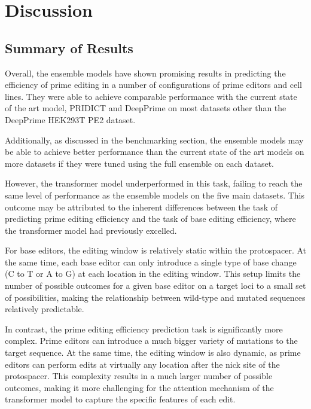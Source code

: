 \chapter{Discussion}

\minitoc

\section{Summary of Results}

Overall, the ensemble models have shown promising results in predicting the efficiency of prime editing in a number of configurations of prime editors and cell lines. They were able to achieve comparable performance with the current state of the art model, PRIDICT and DeepPrime on most datasets other than the DeepPrime HEK293T PE2 dataset. 

Additionally, as discussed in the benchmarking section, the ensemble models may be able to achieve better performance than the current state of the art models on more datasets if they were tuned using the full ensemble on each dataset. 

However, the transformer model underperformed in this task, failing to reach the same level of performance as the ensemble models on the five main datasets. This outcome may be attributed to the inherent differences between the task of predicting prime editing efficiency and the task of base editing efficiency, where the transformer model had previously excelled.

For base editors, the editing window is relatively static within the protospacer. At the same time, each base editor can only introduce a single type of base change (C to T or A to G) at each location in the editing window. This setup limits the number of possible outcomes for a given base editor on a target loci to a small set of possibilities, making the relationship between wild-type and mutated sequences relatively predictable.

In contrast, the prime editing efficiency prediction task is significantly more complex. Prime editors can introduce a much bigger variety of mutations to the target sequence. At the same time, the editing window is also dynamic, as prime editors can perform edits at virtually any location after the nick site of the protospacer. This complexity results in a much larger number of possible outcomes, making it more challenging for the attention mechanism of the transformer model to capture the specific features of each edit.

